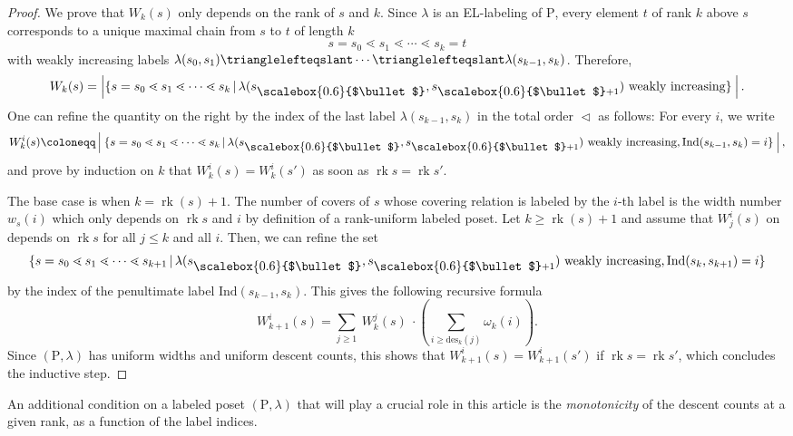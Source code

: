 \documentclass[11pt,a4paper]{amsart}
\theoremstyle{results}
\theoremstyle{definitions}
\def\P{\mathbb{P}}
\newcommand{\abs}[1]{\left\lvert#1\right\rvert}
\newcommand{\rk}{\operatorname{rk}}
\newcommand{\des}{\mathrm{des}}
\newcommand{\medbullet}{\mathbin{\vcenter{\hbox{\scalebox{0.6}{$\bullet$}}}}}
\newcommand{\Ind}{\mathrm{Ind}}
\renewcommand{\P}{\mathrm{P}}
\begin{document}
\begin{proof}
We prove that $W_k(s)$ only depends on the rank of $s$ and $k$. Since $\lambda$ is an EL-labeling of $\P$, every element $t$ of rank $k$ above $s$ corresponds to a unique maximal chain from $s$ to $t$ of length $k$ 
\[
s = s_0 \lessdot s_1 \lessdot \cdots \lessdot s_k = t
\] with weakly increasing labels $\lambda(s_0, s_1) \trianglelefteqslant \cdots \trianglelefteqslant \lambda(s_{k-1}, s_k)$. 
Therefore, 
\[
W_k(s) = \abs{ \{ s = s_0 \lessdot s_1 \lessdot \cdots \lessdot s_k \, | \, \lambda(s_{\medbullet}, s_{\medbullet+1}) \textrm{ weakly increasing}\} \: }. 
\]
One can refine the quantity on the right by the index of the last label $\lambda(s_{k-1}, s_{k})$ in the total order $\vartriangleleft$ as follows: For every $i$, we write 
\[
W_{k}^i(s) \coloneqq \abs{\: \{ s = s_0 \lessdot s_1 \lessdot \cdots \lessdot s_k \, | \, \lambda(s_{\medbullet}, s_{\medbullet+1}) \textrm{ weakly increasing}, \Ind(s_{k-1}, s_{k}) = i\}\:},  
\]
and prove by induction on $k$ that $W_k^i(s) = W_k^i(s')$ as soon as $\rk s = \rk s'$. 

The base case is when $k = \rk(s) + 1 $. The number of covers of $s$ whose covering relation is labeled by the $i$-th label is the width number $w_s(i)$ which only depends on $\rk s$ and $i$ by definition of a rank-uniform labeled poset. Let $k \geqslant \rk(s) + 1$ and assume that $W_j^i(s)$ on depends on $\rk s$ for all $j \leqslant k$ and all $i$. Then, we can refine the set 
\[
\{ s = s_0 \lessdot s_1 \lessdot \cdots \lessdot s_{k+1} \, | \, \lambda(s_{\medbullet}, s_{\medbullet+1}) \textrm{ weakly increasing}, \Ind(s_{k}, s_{k+1}) = i\}
\] by the index of the penultimate label $\Ind(s_{k-1}, s_k)$. This gives the following recursive formula 
\[
W_{k+1}^{i}(s) = \sum_{j \geqslant 1} \: W_{k}^j(s) \: \cdot \left(\sum_{i \geqslant \des_k(j)}\omega_k(i) \right). 
\]
Since $(\P, \lambda)$ has uniform widths and uniform descent counts, this shows that $W_{k+1}^{i}(s) = W_{k+1}^{i}(s')$ if $\rk s = \rk s'$, which concludes the inductive step. 
\end{proof}

An additional condition on a labeled poset $(\P, \lambda)$ that will play a crucial role in this article is the \emph{monotonicity} of the descent counts at a given rank, as a function of the label indices. 
\end{document}
